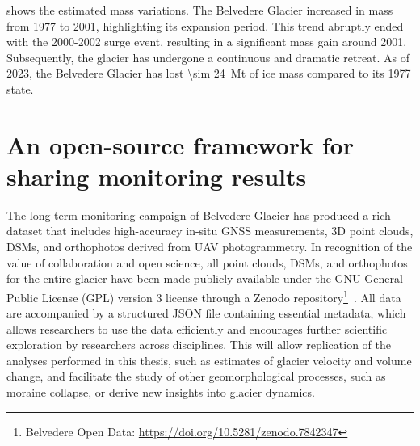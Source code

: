  shows the estimated mass variations.
The Belvedere Glacier increased in mass from 1977 to 2001, highlighting its expansion period. 
This trend abruptly ended with the 2000-2002 surge event, resulting in a significant mass gain around 2001. 
Subsequently, the glacier has undergone a continuous and dramatic retreat. 
As of 2023, the Belvedere Glacier has lost \SI{\sim 24}{\mega\tonne} of ice mass compared to its 1977 state.

\section{An open-source framework for sharing monitoring results}\label{sec:3:open-data}

The long-term monitoring campaign of Belvedere Glacier has produced a rich dataset that includes high-accuracy in-situ GNSS measurements, 3D point clouds, DSMs, and orthophotos derived from UAV photogrammetry.
In recognition of the value of collaboration and open science, all point clouds, DSMs, and orthophotos for the entire glacier have been made publicly available under the GNU General Public License (GPL) version 3 license through a Zenodo repository\footnote{Belvedere Open Data: \url{https://doi.org/10.5281/zenodo.7842347}}~\citep{ioli_2023_zenodo}.
All data are accompanied by a structured JSON file containing essential metadata, which allows researchers to use the data efficiently and encourages further scientific exploration by researchers across disciplines.
This will allow replication of the analyses performed in this thesis, such as estimates of glacier velocity and volume change, and facilitate the study of other geomorphological processes, such as moraine collapse, or derive new insights into glacier dynamics. 

